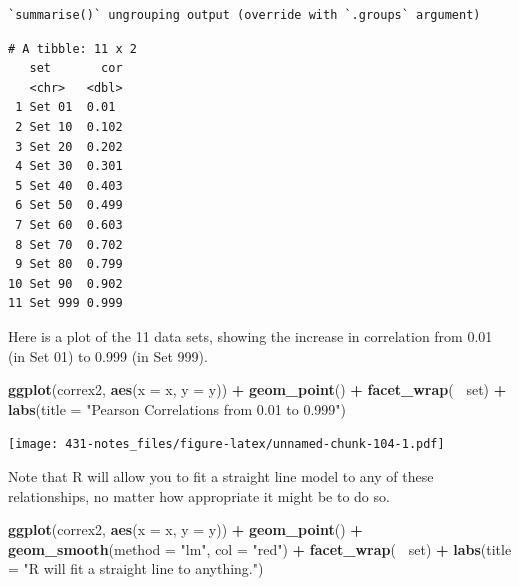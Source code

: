 \documentclass[
]{book}
\newenvironment{Shaded}{\begin{snugshade}}{\end{snugshade}}
\newcommand{\DataTypeTok}[1]{\textcolor[rgb]{0.13,0.29,0.53}{#1}}
\newcommand{\DecValTok}[1]{\textcolor[rgb]{0.00,0.00,0.81}{#1}}
\newcommand{\KeywordTok}[1]{\textcolor[rgb]{0.13,0.29,0.53}{\textbf{#1}}}
\newcommand{\NormalTok}[1]{#1}
\newcommand{\OperatorTok}[1]{\textcolor[rgb]{0.81,0.36,0.00}{\textbf{#1}}}
\newcommand{\StringTok}[1]{\textcolor[rgb]{0.31,0.60,0.02}{#1}}
\begin{document}
\begin{Shaded}
\end{Shaded}

\begin{verbatim}
`summarise()` ungrouping output (override with `.groups` argument)
\end{verbatim}

\begin{verbatim}
# A tibble: 11 x 2
   set       cor
   <chr>   <dbl>
 1 Set 01  0.01 
 2 Set 10  0.102
 3 Set 20  0.202
 4 Set 30  0.301
 5 Set 40  0.403
 6 Set 50  0.499
 7 Set 60  0.603
 8 Set 70  0.702
 9 Set 80  0.799
10 Set 90  0.902
11 Set 999 0.999
\end{verbatim}

Here is a plot of the 11 data sets, showing the increase in correlation from 0.01 (in Set 01) to 0.999 (in Set 999).

\begin{Shaded}
\begin{Highlighting}[]
\KeywordTok{ggplot}\NormalTok{(correx2, }\KeywordTok{aes}\NormalTok{(}\DataTypeTok{x =}\NormalTok{ x, }\DataTypeTok{y =}\NormalTok{ y)) }\OperatorTok{+}
\StringTok{    }\KeywordTok{geom_point}\NormalTok{() }\OperatorTok{+}\StringTok{ }
\StringTok{    }\KeywordTok{facet_wrap}\NormalTok{(}\OperatorTok{~}\StringTok{ }\NormalTok{set) }\OperatorTok{+}
\StringTok{    }\KeywordTok{labs}\NormalTok{(}\DataTypeTok{title =} \StringTok{"Pearson Correlations from 0.01 to 0.999"}\NormalTok{)}
\end{Highlighting}
\end{Shaded}

\texttt{[image: 431-notes\_files/figure-latex/unnamed-chunk-104-1.pdf]}

Note that R will allow you to fit a straight line model to any of these relationships, no matter how appropriate it might be to do so.

\begin{Shaded}
\begin{Highlighting}[]
\KeywordTok{ggplot}\NormalTok{(correx2, }\KeywordTok{aes}\NormalTok{(}\DataTypeTok{x =}\NormalTok{ x, }\DataTypeTok{y =}\NormalTok{ y)) }\OperatorTok{+}
\StringTok{    }\KeywordTok{geom_point}\NormalTok{() }\OperatorTok{+}\StringTok{ }
\StringTok{    }\KeywordTok{geom_smooth}\NormalTok{(}\DataTypeTok{method =} \StringTok{"lm"}\NormalTok{, }\DataTypeTok{col =} \StringTok{"red"}\NormalTok{) }\OperatorTok{+}
\StringTok{    }\KeywordTok{facet_wrap}\NormalTok{(}\OperatorTok{~}\StringTok{ }\NormalTok{set) }\OperatorTok{+}
\StringTok{    }\KeywordTok{labs}\NormalTok{(}\DataTypeTok{title =} \StringTok{"R will fit a straight line to anything."}\NormalTok{)}
\end{Highlighting}
\end{Shaded}
\end{document}
